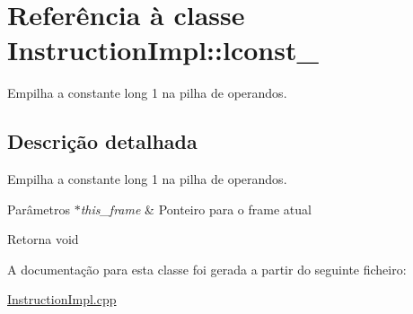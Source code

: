 \hypertarget{class_instruction_impl_1_1lconst__1}{}\section{Referência à classe Instruction\+Impl\+:\+:lconst\+\_}
\label{class_instruction_impl_1_1lconst__1}


Empilha a constante long 1 na pilha de operandos.  




\subsection{Descrição detalhada}
Empilha a constante long 1 na pilha de operandos. 


\begin{DoxyParams}{Parâmetros}
{\em $\ast$this\+\_\+frame} & Ponteiro para o frame atual \\
\hline
\end{DoxyParams}
\begin{DoxyReturn}{Retorna}
void 
\end{DoxyReturn}


A documentação para esta classe foi gerada a partir do seguinte ficheiro\+:\begin{DoxyCompactItemize}
\item 
\hyperlink{_instruction_impl_8cpp}{Instruction\+Impl.\+cpp}\end{DoxyCompactItemize}
